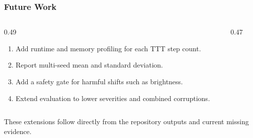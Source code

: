\documentclass[aspectratio=169,8pt]{beamer}
\newcommand{\slidetitle}[1]{\vspace{-0.2cm}\frametitle{#1}}
\begin{document}
\begin{frame}[label=slide17]
\slidetitle{Future Work}
\begin{columns}[T,totalwidth=\linewidth]
\begin{column}{0.49\linewidth}
\begin{enumerate}\setlength\itemsep{0.23cm}
\item Add runtime and memory profiling for each TTT step count.
\item Report multi-seed mean and standard deviation.
\item Add a safety gate for harmful shifts such as brightness.
\item Extend evaluation to lower severities and combined corruptions.
\end{enumerate}
\end{column}
\begin{column}{0.47\linewidth}
\end{column}
\end{columns}
\vfill
\small These extensions follow directly from the repository outputs and current missing evidence.
\end{frame}
\end{document}
